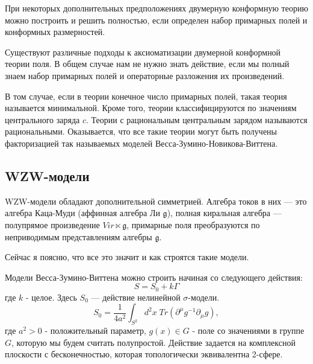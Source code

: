 \documentclass[a4paper,12pt]{article}
\theoremstyle{definition} \newtheorem{Def}{Definition}
\begin{document}
При некоторых дополнительных предположениях двумерную конформную теорию можно построить и решить
полностью, если определен набор примарных полей и конформных размерностей. 

Существуют различные подходы к аксиоматизации двумерной конформной теории поля. В общем случае нам
не нужно знать действие, если мы полный знаем набор примарных полей и операторные разложения их
произведений. 

В том случае, если в теории конечное число примарных полей, такая теория называется минимальной.
Кроме того, теории классифицируются по значениям центрального заряда $c$. Теории с рациональным
центральным зарядом называются рациональными. Оказывается, что все такие теории могут быть получены
факторизацией так называемых моделей Весса-Зумино-Новикова-Виттена.

\subsection{WZW-модели}
\label{sec:wzw}

WZW-модели обладают дополнительной симметрией. Алгебра токов в них --- это алгебра Каца-Муди
(аффинная алгебра Ли $\mathfrak{g}$), полная киральная алгебра --- полупрямое произведение
$Vir\ltimes \mathfrak{g}$, примарные поля преобразуются по неприводимым представлениям алгебры $\mathfrak{g}$.

Сейчас я поясню, что все это значит и как строятся такие модели.

Модели Весса-Зумино-Виттена можно строить начиная со следующего действия:
\begin{equation}
\label{eq:4}
  S=S_0+k\Gamma
\end{equation}
где $k$ - целое.
Здесь $S_0$ --- действие нелинейной $\sigma$-модели.
\begin{equation}
  \label{eq:5}
  S_0=\frac{1}{4a^2}\int_{S^2} d^2x\; Tr (\partial^{\mu}g^{-1}\partial_{\mu}g),
\end{equation}
где $a^2>0$ - положительный параметр, $g(x)\in G$ - поле со значениями в группе $G$, которую мы
будем считать полупростой. Действие задается на комплексной плоскости с бесконечностью, которая
топологически эквивалентна 2-сфере.
\end{document}
